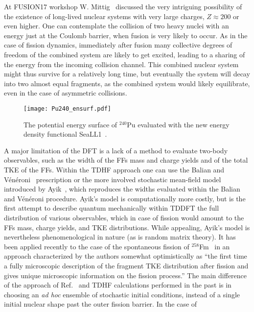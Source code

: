 \documentclass{webofc}
\begin{document}
At FUSION17 workshop W. Mittig~\cite{mittig}
discussed the very intriguing possibility of the existence of long-lived nuclear systems
with very large charges, $Z\approx 200$  or even higher. One can contemplate the collision of two
heavy nuclei with an energy just at the Coulomb barrier, when fusion is very likely to occur. As in
the case of fission dynamics, immediately after fusion many collective degrees of freedom of the
combined system are likely to get excited, leading to a sharing of the energy from the incoming
collision channel. This combined nuclear system might thus survive
for a relatively long time, but eventually the system
will decay into two almost equal fragments, as the combined system would likely equilibrate,
even in the case of asymmetric collisions.

\begin{wrapfigure}{r}{0.36\textwidth}
\texttt{[image: Pu240\_ensurf.pdf]}
\caption{ \label{fig:ab5}   The potential energy surface of $^{240}$Pu evaluated with
the new energy density functional SeaLL1~\cite{NEDF}.}
\end{wrapfigure}
A major limitation of the DFT is a lack of a method to evaluate two-body observables, such
as the width of the FFs mass and charge yields and of the total TKE
of the FFs. Within the TDHF approach one can use the Balian and
V\'{e}n\'{e}roni~\cite{Balian} prescription or the more involved stochastic
mean-field model introduced by Ayik~\cite{Ayik}, which reproduces the widths
evaluated within the Balian and V\'{e}n\'{e}roni procedure. Ayik's model is
computationally more costly, but is the first attempt to describe
quantum mechanically within TDDFT the full distribution
of various observables, which in case of fission would amount to the FFs mass,
charge yields, and TKE distributions. While appealing, Ayik's model is
nevertheless phenomenological in nature (as is random matrix theory).
It has been applied recently to the case of the spontaneous fission of
$^{258}$Fm~\cite{Tanimura} in an approach characterized by the authors somewhat
optimistically as ``the first time a fully microscopic description of the fragment TKE
distribution after fission and gives unique microscopic information on the fission process.''
The main difference of the approach of Ref.~\cite{Tanimura} and TDHF calculations
performed in the past is in choosing an {\it ad hoc} ensemble of stochastic initial conditions,
instead of a single initial nuclear shape past the outer fission barrier. In the case of
\end{document}
